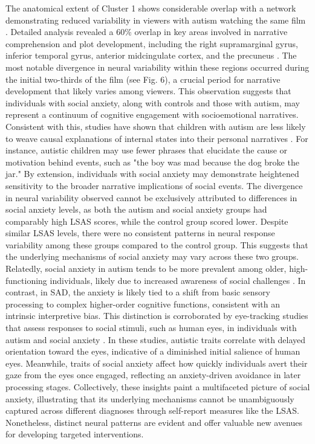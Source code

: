 The anatomical extent of Cluster 1 shows considerable overlap with a network demonstrating reduced variability in viewers with autism watching the same film \citep{mangnus2024BPCNNI}. Detailed analysis revealed a 60\% overlap in key areas involved in narrative comprehension and plot development, including the right supramarginal gyrus, inferior temporal gyrus, anterior midcingulate cortex, and the precuneus \citep{jaaskelainen2021,tylen2015}. The most notable divergence in neural variability within these regions occurred during the initial two-thirds of the film (see Fig. 6), a crucial period for narrative development that likely varies among viewers. This observation suggests that individuals with social anxiety, along with controls and those with autism, may represent a continuum of cognitive engagement with socioemotional narratives. Consistent with this, studies have shown that children with autism are less likely to weave causal explanations of internal states into their personal narratives \citep{losh2003,tager-flusberg1995}. For instance, autistic children may use fewer phrases that elucidate the cause or motivation behind events, such as "the boy was mad because the dog broke the jar." By extension, individuals with social anxiety may demonstrate heightened sensitivity to the broader narrative implications of social events.
The divergence in neural variability observed cannot be exclusively attributed to differences in social anxiety levels, as both the autism and social anxiety groups had comparably high LSAS scores, while the control group scored lower. Despite similar LSAS levels, there were no consistent patterns in neural response variability among these groups compared to the control group. This suggests that the underlying mechanisms of social anxiety may vary across these two groups. Relatedly, social anxiety in autism tends to be more prevalent among older, high-functioning individuals, likely due to increased awareness of social challenges \citep{white2009}. In contrast, in SAD, the anxiety is likely tied to a shift from basic sensory processing to complex higher-order cognitive functions, consistent with an intrinsic interpretive bias. This distinction is corroborated by eye-tracking studies that assess responses to social stimuli, such as human eyes, in individuals with autism and social anxiety \citep{kleberg2017,ni2023}. In these studies, autistic traits correlate with delayed orientation toward the eyes, indicative of a diminished initial salience of human eyes. Meanwhile, traits of social anxiety affect how quickly individuals avert their gaze from the eyes once engaged, reflecting an anxiety-driven avoidance in later processing stages. Collectively, these insights paint a multifaceted picture of social anxiety, illustrating that its underlying mechanisms cannot be unambiguously captured across different diagnoses through self-report measures like the LSAS. Nonetheless, distinct neural patterns are evident and offer valuable new avenues for developing targeted interventions.
